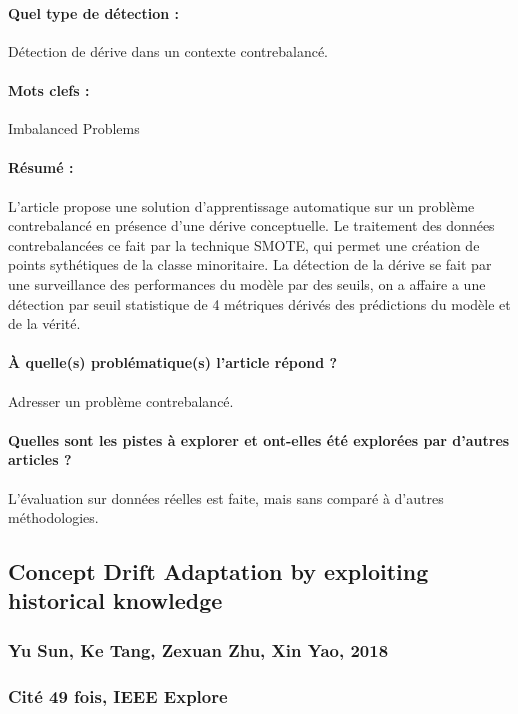 \documentclass[11pt,a4paper]{report}
\begin{document}
\paragraph{Quel type de détection :} Détection de dérive dans un  contexte contrebalancé.

\paragraph{Mots clefs :} Imbalanced Problems

\paragraph{Résumé :} L'article propose une solution d'apprentissage automatique sur un problème contrebalancé en présence d'une dérive conceptuelle. Le traitement des données contrebalancées ce fait par la technique SMOTE, qui permet une création de points sythétiques de la classe minoritaire. La détection de la dérive se fait par une surveillance des performances du modèle par des seuils, on a affaire a une détection par seuil statistique de 4 métriques dérivés des prédictions du modèle et de la vérité.

\paragraph{À quelle(s) problématique(s) l'article répond ?} Adresser un problème contrebalancé.

\paragraph{Quelles sont les pistes à explorer et ont-elles  été explorées par d'autres articles ?} L'évaluation sur données réelles est faite, mais sans comparé à d'autres méthodologies.








\subsection{Concept Drift Adaptation by exploiting historical knowledge}
\subsubsection{Yu Sun, Ke Tang, Zexuan Zhu, Xin Yao, 2018}

\subsubsection{Cité 49 fois, IEEE Explore}
\end{document}
